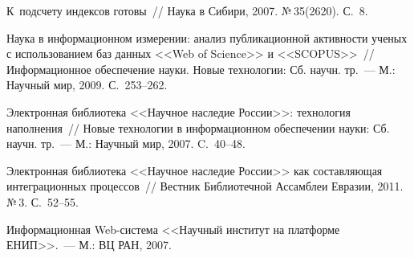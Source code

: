 \begin{multicols}{2}
{{\begin{thebibliography}{99}
К~подсчету индексов готовы~// Наука в Сибири, 2007. №\,35(2620). С.~8.

Наука в информационном измерении: анализ публикационной активности ученых с 
использованием баз данных <<Web of Science>> и <<SCOPUS>>~// Информационное 
обеспечение науки. Новые технологии: Сб. научн. тр.~--- М.: Научный мир, 2009. 
С.~253--262. 


Электронная библиотека <<Научное наследие России>>: технология наполнения~// Новые 
технологии в информационном обеспечении науки: Сб. научн. тр.~--- М.: Научный 
мир, 2007. C.~40--48.

Электронная библиотека <<Научное наследие России>> как составляющая 
интеграционных процессов~// Вестник Библиотечной Ассамблеи Евразии, 2011. №\,3. 
С.~52--55.

\label{end\stat} 

Информационная Web-сис\-те\-ма <<Научный институт на платформе ЕНИП>>.~--- М.: 
ВЦ РАН, 2007. 


 \end{thebibliography}
}
}


\end{multicols}


%
